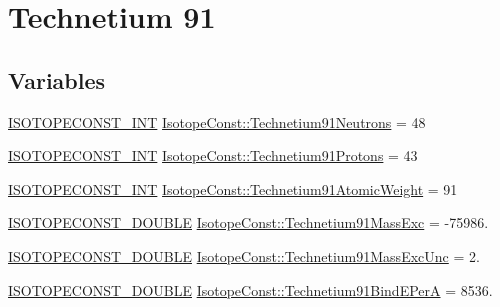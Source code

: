 \hypertarget{group___isotope_const-_technetium-_tc91}{}\section{Technetium 91}
\label{group___isotope_const-_technetium-_tc91}
\subsection*{Variables}
\begin{DoxyCompactItemize}
\item 
\mbox{\hyperlink{group___isotope_const-_macros_ga5f18360b3e99483a35c32d789e62621c}{I\+S\+O\+T\+O\+P\+E\+C\+O\+N\+S\+T\+\_\+\+I\+NT}} \mbox{\hyperlink{group___isotope_const-_technetium-_tc91_gabf69290355416cf5646af8478daaaf78}{Isotope\+Const\+::\+Technetium91\+Neutrons}} = 48
\item 
\mbox{\hyperlink{group___isotope_const-_macros_ga5f18360b3e99483a35c32d789e62621c}{I\+S\+O\+T\+O\+P\+E\+C\+O\+N\+S\+T\+\_\+\+I\+NT}} \mbox{\hyperlink{group___isotope_const-_technetium-_tc91_ga18b3233f4d3a9e5c7a44e3544e07f927}{Isotope\+Const\+::\+Technetium91\+Protons}} = 43
\item 
\mbox{\hyperlink{group___isotope_const-_macros_ga5f18360b3e99483a35c32d789e62621c}{I\+S\+O\+T\+O\+P\+E\+C\+O\+N\+S\+T\+\_\+\+I\+NT}} \mbox{\hyperlink{group___isotope_const-_technetium-_tc91_ga9f1b4359463419b0095fe46c0fd9ed14}{Isotope\+Const\+::\+Technetium91\+Atomic\+Weight}} = 91
\item 
\mbox{\hyperlink{group___isotope_const-_macros_ga8f45a7272ce02c0b4c65c44636ed719a}{I\+S\+O\+T\+O\+P\+E\+C\+O\+N\+S\+T\+\_\+\+D\+O\+U\+B\+LE}} \mbox{\hyperlink{group___isotope_const-_technetium-_tc91_ga5ab1d695aa80f9b0fce07e9d881211a4}{Isotope\+Const\+::\+Technetium91\+Mass\+Exc}} = -\/75986.
\item 
\mbox{\hyperlink{group___isotope_const-_macros_ga8f45a7272ce02c0b4c65c44636ed719a}{I\+S\+O\+T\+O\+P\+E\+C\+O\+N\+S\+T\+\_\+\+D\+O\+U\+B\+LE}} \mbox{\hyperlink{group___isotope_const-_technetium-_tc91_gad19fa8c2c7128ba0a928ebe2cf96e943}{Isotope\+Const\+::\+Technetium91\+Mass\+Exc\+Unc}} = 2.
\item 
\mbox{\hyperlink{group___isotope_const-_macros_ga8f45a7272ce02c0b4c65c44636ed719a}{I\+S\+O\+T\+O\+P\+E\+C\+O\+N\+S\+T\+\_\+\+D\+O\+U\+B\+LE}} \mbox{\hyperlink{group___isotope_const-_technetium-_tc91_ga0eaf9f5945a27fcabece7db43d3c0a16}{Isotope\+Const\+::\+Technetium91\+Bind\+E\+PerA}} = 8536.
\item 

\end{DoxyCompactItemize}
